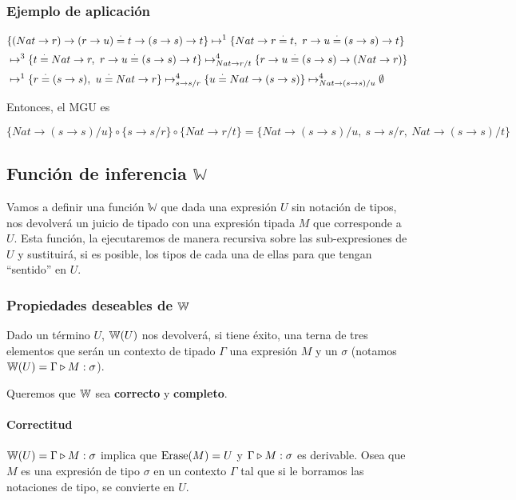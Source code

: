 \subsubsection{Ejemplo de aplicación}
\begin{equation*}
\begin{split}
&\{(Nat\to r)\to(r\to u) \overset{\cdot}{=} t\to(s\to s)\to t\}
\mapsto^1 \{Nat\to r\overset{\cdot}{=} t,~r\to u\overset{\cdot}{=} (s\to s)\to t\} \\
&\mapsto^3 \{t\overset{\cdot}{=} Nat\to r,~r\to u\overset{\cdot}{=} (s\to s)\to t\} 
\mapsto^4_{Nat\to r/t} \{r\to u\overset{\cdot}{=} (s\to s)\to (Nat\to r)\} \\
&\mapsto^1 \{r\overset{\cdot}{=}(s\to s),~u\overset{\cdot}{=} Nat\to r\} 
\mapsto^4_{s\to s/r} \{u\overset{\cdot}{=} Nat\to (s\to s)\}
\mapsto^4_{Nat\to(s\to s)/u} \emptyset \\
\end{split}
\end{equation*}

Entonces, el MGU es 

$\{Nat\to(s\to s)/u\}\circ\{s\to s/r\}\circ\{Nat\to r/t\} = \{Nat\to(s\to s)/u,~s\to s/r,~Nat\to (s\to s)/t\}$

\subsection{Función de inferencia \texorpdfstring{$\mathbb{W}$}{W}}
Vamos a definir una función $\mathbb{W}$ que dada una expresión $U$ sin notación de tipos, nos devolverá un juicio de tipado con una expresión tipada $M$ que corresponde a $U$. Esta función, la ejecutaremos de manera recursiva sobre las sub-expresiones de $U$ y sustituirá, si es posible, los tipos de cada una de ellas para que tengan ``sentido'' en $U$.




\subsubsection{Propiedades deseables de \texorpdfstring{$\mathbb{W}$}{W}}
Dado un término $U$, $\mathbb{W}(U)$ nos devolverá, si tiene éxito, una terna de tres elementos que serán un contexto de tipado $\Gamma$ una expresión $M$ y un $\sigma$ (notamos $\mathbb{W}(U) = \Gamma\triangleright M : \sigma$).

Queremos que $\mathbb{W}$ sea \textbf{correcto} y \textbf{completo}.

\paragraph{Correctitud} $\mathbb{W}(U) = \Gamma\triangleright M : \sigma$ implica que $\operatorname{Erase}(M) = U$ y $\Gamma\triangleright M : \sigma$ es derivable. Osea que $M$ es una expresión de tipo $\sigma$ en un contexto $\Gamma$ tal que si le borramos las notaciones de tipo, se convierte en $U$.

